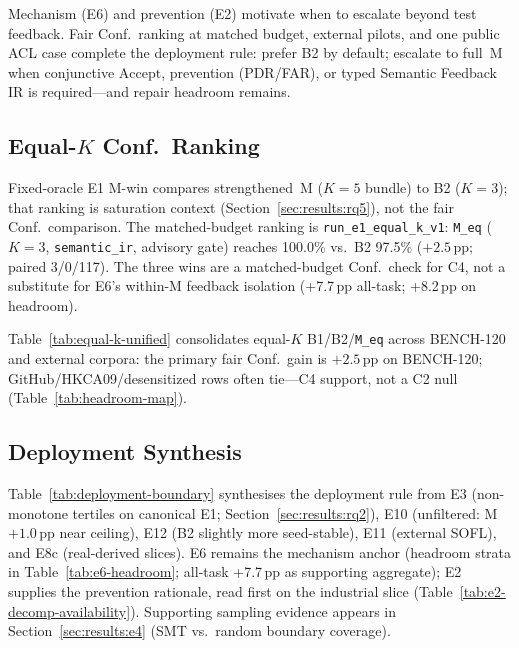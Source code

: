 Mechanism (E6) and prevention (E2) motivate when to escalate beyond test
feedback.
Fair Conf.\ ranking at matched budget, external pilots, and one public ACL
case complete the deployment rule: prefer B2 by default; escalate to full~M
when conjunctive $\mathrm{Accept}$, prevention (PDR/FAR), or typed Semantic
Feedback IR is required---and repair headroom remains.

\subsection{Equal-$K$ Conf.\ Ranking}

Fixed-oracle E1 M-win compares strengthened~M ($K{=}5$ bundle) to B2
($K{=}3$); that ranking is saturation context
(Section~\ref{sec:results:rq5}), not the fair Conf.\ comparison.
The matched-budget ranking is \texttt{run\_e1\_equal\_k\_v1}:
\texttt{M\_eq} ($K{=}3$, \texttt{semantic\_ir}, advisory gate) reaches
100.0\% vs.\ B2 97.5\% (${+}2.5$\,pp; paired 3/0/117).
The three wins are a matched-budget Conf.\ check for C4, not a substitute for
E6's within-M feedback isolation (+7.7\,pp all-task; +8.2\,pp on headroom).



Table~\ref{tab:equal-k-unified} consolidates equal-$K$ B1/B2/\texttt{M\_eq}
across BENCH-120 and external corpora: the primary fair Conf.\ gain is
${+}2.5$\,pp on BENCH-120; GitHub/HKCA09/desensitized rows often tie---C4
support, not a C2 null (Table~\ref{tab:headroom-map}).

\subsection{Deployment Synthesis}

Table~\ref{tab:deployment-boundary} synthesises the deployment rule from
E3 (non-monotone tertiles on canonical E1; Section~\ref{sec:results:rq2}),
E10 (unfiltered: M ${+}1.0$\,pp near ceiling), E12 (B2 slightly more
seed-stable), E11 (external SOFL), and E8c (real-derived slices).
E6 remains the mechanism anchor (headroom strata in
Table~\ref{tab:e6-headroom}; all-task +7.7\,pp as supporting aggregate); E2
supplies the prevention rationale, read first on the industrial slice
(Table~\ref{tab:e2-decomp-availability}).
Supporting sampling evidence appears in Section~\ref{sec:results:e4}
(SMT vs.\ random boundary coverage).




